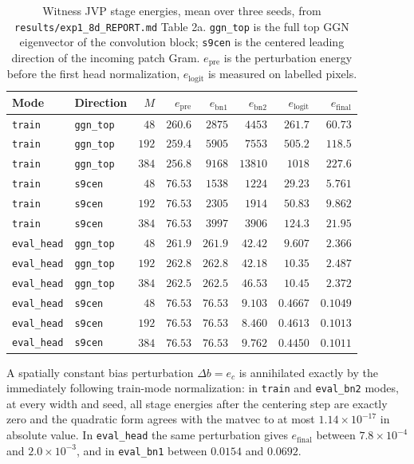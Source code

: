 \begin{table}[htbp]
\centering
\small
\caption{Witness JVP stage energies, mean over three seeds, from
\texttt{results/exp1\_8d\_REPORT.md} Table 2a. \texttt{ggn\_top} is the full
top GGN eigenvector of the convolution block; \texttt{s9cen} is the centered
leading direction of the incoming patch Gram. $e_{\mathrm{pre}}$ is the
perturbation energy before the first head normalization,
$e_{\mathrm{logit}}$ is measured on labelled pixels.}
\label{tab:app_jvp}
\begin{tabular}{llrrrrrr}
\toprule
Mode & Direction & $M$ & $e_{\mathrm{pre}}$ & $e_{\mathrm{bn1}}$ & $e_{\mathrm{bn2}}$ & $e_{\mathrm{logit}}$ & $e_{\mathrm{final}}$ \\
\midrule
\texttt{train} & \texttt{ggn\_top} & $48$  & $260.6$ & $2875$ & $4453$ & $261.7$ & $60.73$ \\
\texttt{train} & \texttt{ggn\_top} & $192$ & $259.4$ & $5905$ & $7553$ & $505.2$ & $118.5$ \\
\texttt{train} & \texttt{ggn\_top} & $384$ & $256.8$ & $9168$ & $13810$ & $1018$ & $227.6$ \\
\texttt{train} & \texttt{s9cen}    & $48$  & $76.53$ & $1538$ & $1224$ & $29.23$ & $5.761$ \\
\texttt{train} & \texttt{s9cen}    & $192$ & $76.53$ & $2305$ & $1914$ & $50.83$ & $9.862$ \\
\texttt{train} & \texttt{s9cen}    & $384$ & $76.53$ & $3997$ & $3906$ & $124.3$ & $21.95$ \\
\midrule
\texttt{eval\_head} & \texttt{ggn\_top} & $48$  & $261.9$ & $261.9$ & $42.42$ & $9.607$ & $2.366$ \\
\texttt{eval\_head} & \texttt{ggn\_top} & $192$ & $262.8$ & $262.8$ & $42.18$ & $10.35$ & $2.487$ \\
\texttt{eval\_head} & \texttt{ggn\_top} & $384$ & $262.5$ & $262.5$ & $46.53$ & $10.45$ & $2.372$ \\
\texttt{eval\_head} & \texttt{s9cen}    & $48$  & $76.53$ & $76.53$ & $9.103$ & $0.4667$ & $0.1049$ \\
\texttt{eval\_head} & \texttt{s9cen}    & $192$ & $76.53$ & $76.53$ & $8.460$ & $0.4613$ & $0.1013$ \\
\texttt{eval\_head} & \texttt{s9cen}    & $384$ & $76.53$ & $76.53$ & $9.762$ & $0.4450$ & $0.1011$ \\
\bottomrule
\end{tabular}
\end{table}

A spatially constant bias perturbation $\Delta b = e_c$ is annihilated exactly
by the immediately following train-mode normalization: in \texttt{train} and
\texttt{eval\_bn2} modes, at every width and seed, all stage energies after the
centering step are exactly zero and the quadratic form agrees with the matvec
to at most $1.14\times10^{-17}$ in absolute value. In \texttt{eval\_head} the
same perturbation gives $e_{\mathrm{final}}$ between $7.8\times10^{-4}$ and
$2.0\times10^{-3}$, and in \texttt{eval\_bn1} between $0.0154$ and $0.0692$.

